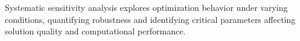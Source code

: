 Systematic sensitivity analysis explores optimization behavior under varying conditions, quantifying robustness and identifying critical parameters affecting solution quality and computational performance.
